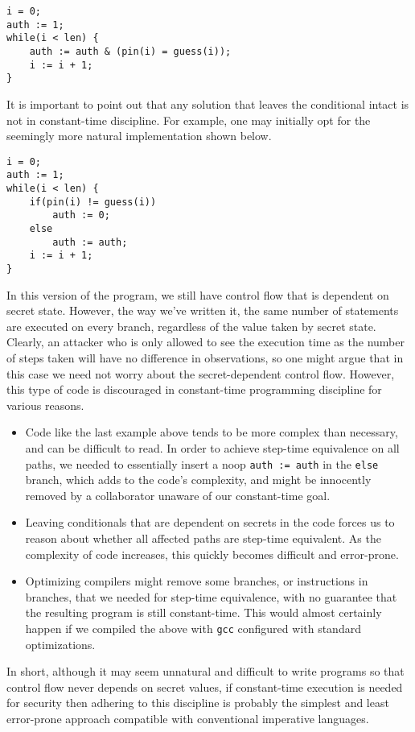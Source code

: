 \documentclass[11pt,twoside]{scrartcl}
\begin{document}
\lstset{language=C}
\begin{lstlisting}
i = 0;
auth := 1;
while(i < len) {
	auth := auth & (pin(i) = guess(i));
	i := i + 1;
}
\end{lstlisting}

It is important to point out that any solution that leaves the conditional intact is not in constant-time discipline. For example, one may initially opt for the seemingly more natural implementation shown below.

\lstset{language=C}
\begin{lstlisting}
i = 0;
auth := 1;
while(i < len) {
	if(pin(i) != guess(i)) 
		auth := 0;
	else
		auth := auth;
	i := i + 1;
}
\end{lstlisting}

In this version of the program, we still have control flow that is dependent on secret state. However, the way we've written it, the same number of statements are executed on every branch, regardless of the value taken by secret state. Clearly, an attacker who is only allowed to see the execution time as the number of steps taken will have no difference in observations, so one might argue that in this case we need not worry about the secret-dependent control flow. However, this type of code is discouraged in constant-time programming discipline for various reasons.
\begin{itemize}
\item Code like the last example above tends to be more complex than necessary, and can be difficult to read. In order to achieve step-time equivalence on all paths, we needed to essentially insert a noop \texttt{auth := auth} in the \texttt{else} branch, which adds to the code's complexity, and might be innocently removed by a collaborator unaware of our constant-time goal.

\item Leaving conditionals that are dependent on secrets in the code forces us to reason about whether all affected paths are step-time equivalent. As the complexity of code increases, this quickly becomes difficult and error-prone.

\item Optimizing compilers might remove some branches, or instructions in branches, that we needed for step-time equivalence, with no guarantee that the resulting program is still constant-time. This would almost certainly happen if we compiled the above with \texttt{gcc} configured with standard optimizations.
\end{itemize}
In short, although it may seem unnatural and difficult to write programs so that control flow never depends on secret values, if constant-time execution is needed for security then adhering to this discipline is probably the simplest and least error-prone approach compatible with conventional imperative languages.
\end{document}
